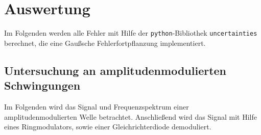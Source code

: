 \section{Auswertung}
\label{sec:auswertung}
Im Folgenden werden alle Fehler mit Hilfe der \texttt{python}-Bibliothek
\texttt{uncertainties}\cite{py-uncertainties} berechnet, die eine Gaußsche
Fehlerfortpflanzung implementiert.

\subsection{Untersuchung an amplitudenmodulierten Schwingungen}
\label{subsec:am-auswertung}
Im Folgenden wird das Signal und Frequenzspektrum einer amplitudenmodulierten
Welle betrachtet. Anschließend wird das Signal mit Hilfe eines Ringmodulators,
sowie einer Gleichrichterdiode demoduliert.


